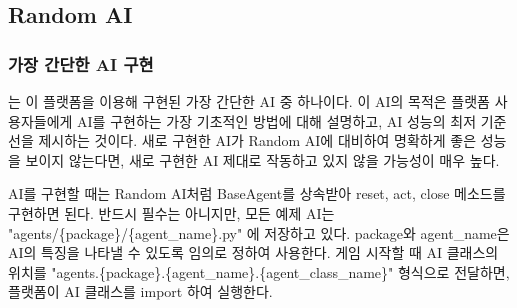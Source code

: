 \documentclass[letterpaper,10pt,english]{sphinxmanual}
\begin{document}
\subsection{Random AI}
\label{\detokenize{03-basic_ai_examples:random-ai}}
\def\sphinxLiteralBlockLabel{\label{\detokenize{03-basic_ai_examples:random-ai-code}}\label{\detokenize{03-basic_ai_examples:id28}}}
%
\begin{sphinxVerbatim}[commandchars=\\\{\},numbers=left,firstnumber=1,stepnumber=1]
 
   
    

 


     

      
          
         

     
\end{sphinxVerbatim}


\subsubsection{가장 간단한 AI 구현}
\label{\detokenize{03-basic_ai_examples:id1}}
{\hyperref[\detokenize{03-basic_ai_examples:random-ai-code}]{}} 는 이 플랫폼을 이용해 구현된 가장 간단한 AI 중 하나이다.
이 AI의 목적은 플랫폼 사용자들에게 AI를 구현하는 가장 기초적인 방법에 대해 설명하고,
AI 성능의 최저 기준선을 제시하는 것이다.
새로 구현한 AI가 Random AI에 대비하여 명확하게 좋은 성능을 보이지 않는다면,
새로 구현한 AI 제대로 작동하고 있지 않을 가능성이 매우 높다.

AI를 구현할 때는 Random AI처럼 BaseAgent를 상속받아 reset, act, close 메소드를 구현하면 된다.
반드시 필수는 아니지만, 모든 예제 AI는 "agents/\{package\}/\{agent\_name\}.py" 에 저장하고 있다. package와 agent\_name은
AI의 특징을 나타낼 수 있도록 임의로 정하여 사용한다.
게임 시작할 때 AI 클래스의 위치를 "agents.\{package\}.\{agent\_name\}.\{agent\_class\_name\}" 형식으로 전달하면,
플랫폼이 AI 클래스를 import 하여 실행한다.
\end{document}

